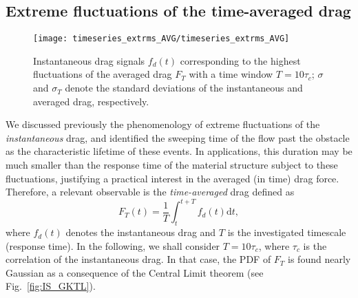 \subsection{Extreme fluctuations of the time-averaged drag }
\label{sec:time_avg}

\begin{figure}
	\centering
	\texttt{[image: timeseries\_extrms\_AVG/timeseries\_extrms\_AVG]}
	\caption{Instantaneous drag signals $f_d(t)$ corresponding to the highest fluctuations of the averaged  drag $F_T$ with a time window $T = 10 \tau_c$;  $\sigma$ and $\sigma_T$ denote the standard deviations of the instantaneous and averaged drag, respectively.}
	\label{fig:extreme_avg}
\end{figure}


%

We discussed previously the phenomenology of extreme fluctuations of the \emph{instantaneous} drag, and identified the sweeping time of the flow past the obstacle as the characteristic lifetime of these events.
%
In applications, this duration may be much smaller than the response time of the material structure subject to these fluctuations, justifying a practical interest in the averaged (in time) drag force.
%
%
Therefore, a relevant observable is the \textit{time-averaged} drag defined as
\begin{equation}
\label{eq:def_time_averaged_drag}
F_T(t) = \frac{1}{T}\int_t^{t+T} f_d(t) \mathrm{d}t,
\end{equation}
where $f_d(t)$ denotes the instantaneous drag and $T$ is the investigated timescale (response time).
In the following, we shall consider $T=10\tau_c$, where $\tau_c$ is the correlation of the instantaneous drag.
In that case, the PDF of $F_T$ is found nearly Gaussian as a consequence of the Central Limit theorem (see Fig.~\ref{fig:IS_GKTL}).

